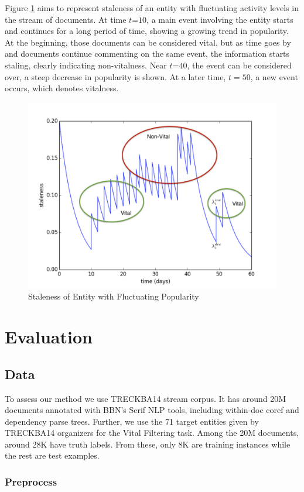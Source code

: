 \documentclass{article}
\begin{document}
Figure \ref{stalenessmedium} aims to represent staleness of an entity with fluctuating activity levels in the stream of documents. At time $t\mathord{=}10$, a main event involving the entity starts and continues for a long period of time, showing a growing trend in popularity. 
At the beginning, those documents can be considered vital, but as time goes by and documents continue commenting on the same event, the information starts staling, clearly indicating non-vitalness.
Near $t\mathord{=}40$, the event can be considered over, a steep decrease in popularity is shown. At a later time, $t=50$, a new event occurs, which denotes vitalness.

\begin{figure}[h!]
\centering
\includegraphics[width=.5\textwidth]{fig/staleness2.pdf}
\caption{Staleness of Entity with Fluctuating Popularity}
\label{stalenessmedium}
\end{figure}


\section{Evaluation}
\label{evaluation}

\subsection{Data}
\label{data}

To assess our method we use TRECKBA14 stream corpus. It has around 20M documents annotated with BBN's Serif NLP tools, including within-doc coref and dependency parse trees. Further, we use the 71 target entities given by TRECKBA14 organizers for the Vital Filtering task. Among the 20M documents, around 28K have truth labels. From these, only 8K are training instances while the rest are test examples.

\subsubsection{Preprocess}
\end{document}
